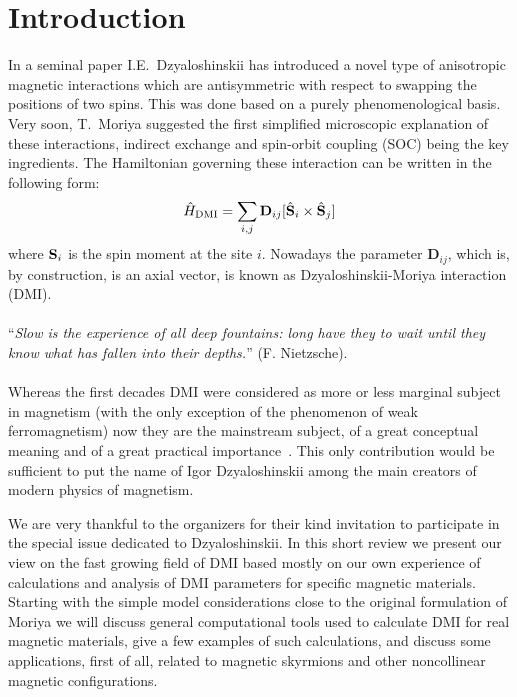 \documentclass[aps,prl,twocolumn,showpacs,amsmath,amssymb]{revtex4-1}
\begin{document}
\section{Introduction}
In a seminal paper \cite{dzyaloshinskii} I.E.~Dzyaloshinskii has introduced a novel type of anisotropic magnetic interactions which are antisymmetric with respect to swapping the positions of two spins. 
This was done based on a purely phenomenological basis. 
Very soon, T.~Moriya \cite{moriya} suggested the first simplified microscopic explanation of these interactions, indirect exchange and spin-orbit coupling (SOC) being the key ingredients. 
The Hamiltonian governing these interaction can be written in the following form:
\begin{eqnarray}
\hat H_{\rm DMI} = \sum_{i,j} \mathbf{D}_{ij} [\hat {\bf S}_i \times \hat {\bf S}_j]
\label{DMHAMorig}
\end{eqnarray}
where ${\bf S}_i$ is the spin moment at the site $i$. 
Nowadays the parameter $\mathbf{D}_{ij}$, which is, by construction, is an axial vector, is known as Dzyaloshinskii-Moriya interaction (DMI). 
\\
\\
``\textit{Slow is the experience of all deep fountains: long have they to wait until they know what has fallen into their depths.}'' (F. Nietzsche). 
\\
\\
Whereas the first decades DMI were considered as more or less marginal subject in magnetism (with the only exception of the phenomenon of weak ferromagnetism) now they are the mainstream subject, of a great conceptual meaning and of a great practical importance~\cite{katsura,sergienko,mostovoy,bode,heide,rohart}. 
This only contribution would be sufficient to put the name of Igor Dzyaloshinskii among the main creators of modern physics of magnetism. 

We are very thankful to the organizers for their kind invitation to participate in the special issue dedicated to Dzyaloshinskii. In this short review we present our view on the fast growing field of DMI based mostly on our own experience of calculations and analysis of DMI parameters for specific magnetic materials. Starting with the simple model considerations close to the original formulation of Moriya we will discuss general computational tools used to calculate DMI for real magnetic materials, give a few examples of such calculations, and discuss some applications, first of all, related to magnetic skyrmions and other noncollinear magnetic configurations. 
\end{document}
